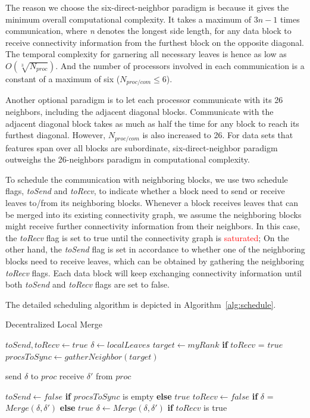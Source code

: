 \documentclass[10pt, conference, compsocconf]{IEEEtran}
\begin{document}
The reason we choose the six-direct-neighbor paradigm is because it gives the minimum overall computational complexity. It takes a maximum of ${3n-1}$ times communication, where \emph{n} denotes the longest side length, for any data block to receive connectivity information from the furthest block on the opposite diagonal. The temporal complexity for garnering all necessary leaves is hence as low as ${O(\sqrt[3]{N_{proc}})}$. And the number of processors involved in each communication is a constant of a maximum of six ($N_{proc/com} \leq 6$).

Another optional paradigm is to let each processor communicate with its 26 neighbors, including the adjacent diagonal blocks. Communicate with the adjacent diagonal block takes as much as half the time for any block to reach its furthest diagonal. However, $N_{proc/com}$  is also increased to 26. For data sets that features span over all blocks are subordinate, six-direct-neighbor paradigm outweighs the 26-neighbors paradigm in computational complexity.

To schedule the communication with neighboring blocks, we use two schedule flags, \emph{toSend} and \emph{toRecv}, to indicate whether a block need to send or receive leaves to/from its neighboring blocks. Whenever a block receives leaves that can be merged into its existing connectivity graph, we assume the neighboring blocks might receive further connectivity information from their neighbors. In this case, the \emph{toRecv} flag is set to true until the connectivity graph is \textcolor{red}{saturated}; On the other hand, the \emph{toSend} flag is set in accordance to whether one of the neighboring blocks need to receive leaves, which can be obtained by gathering the neighboring \emph{toRecv} flags. Each data block will keep exchanging connectivity information until both \emph{toSend} and \emph{toRecv} flags are set to false.

The detailed scheduling algorithm is depicted in Algorithm~\ref{alg:schedule}.
\begin{algorithm}
\caption{Decentralized Local Merge}
\label{alg:schedule}
	\begin{algorithmic}
	\STATE $toSend, toRecv \leftarrow true$
	\STATE $\delta \leftarrow localLeaves$
		\STATE $target \leftarrow myRank$ \textbf{if} $toRecv$ = $true$
		\STATE $procsToSync \leftarrow gatherNeighbor(target)$
		
				\STATE send $\delta$ to $proc$
			\ENDIF
				\STATE receive $\delta\prime$ from $proc$
			\ENDIF
		\ENDFOR
		
		\STATE $toSend \leftarrow false$ \textbf{if} $procsToSync$ is empty \textbf{else} $true$
		\STATE $toRecv \leftarrow false$ \textbf{if} $\delta$ = $Merge(\delta, \delta\prime)$ \textbf{else} $true$
		\STATE $\delta \leftarrow Merge(\delta, \delta\prime)$ \textbf{if} $toRecv$ is true
  \ENDWHILE
  \end{algorithmic}
\end{algorithm}
\end{document}
